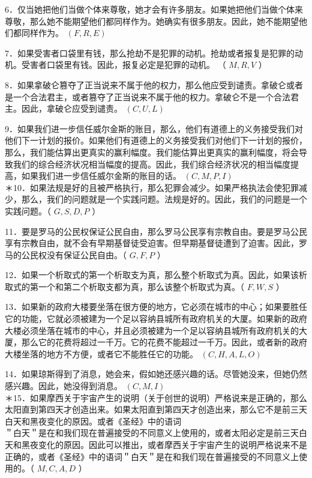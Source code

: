6．仅当她把他们当做个体来尊敬，她才会有许多朋友。如果她把他们当做个体来尊敬，那么她不能期望他们都同样作为。她确实有很多朋友。因此，她不能期望他们都同样作为。 $(F, R, E)$

7．如果受害者口袋里有钱，那么抢劫不是犯罪的动机。抢劫或者报复是犯罪的动机。受害者口袋里有钱。因此，报复必定是犯罪的动机。 （ $M, R, V$ ）

8．如果拿破仑篡夺了正当说来不属于他的权力，那么他应受到谴责。拿破仑或者是一个合法君主，或者篡夺了正当说来不属于他的权力。拿破仑不是一个合法君主。因此，拿破仑应受到谴责。 $(C, U, L)$

9．如果我们进一步信任威尔金斯的账目，那么，他们有道德上的义务接受我们对他们下一计划的报价。如果他们有道德上的义务接受我们对他们下一计划的报价，那么，我们能估算出更真实的赢利幅度。我们能估算出更真实的赢利幅度，将会导致我们的综合经济状况相当幅度的提高。因此，我们综合经济状况的相当幅度提高，如果我们进一步信任威尔金斯的账目的话。 $(C, M, P, I)$\\
＊10．如果法规是好的且被严格执行，那么犯罪会减少。如果严格执法会使犯罪减少，那么，我们的问题就是一个实践问题。法规是好的。因此，我们的问题是一个实践问题。（ $G, S, D, P$ ）

11．要是罗马的公民权保证公民自由，那么罗马公民享有宗教自由。要是罗马公民享有宗教自由，就不会有早期基督徒受迫害。但早期基督徒遭到了迫害。因此，罗马的公民权没有保证公民自由。（ $G, F, P$ ）

12．如果一个析取式的第一个析取支为真，那么整个析取式为真。因此，如果该析取式的第一个和第二个析取支都为真，那么该整个析取式为真。（ $F, W, S$ ）

13．如果新的政府大楼要坐落在很方便的地方，它必须在城市的中心；如果要胜任它的功能，它就必须被建为一个足以容纳县城所有政府机关的大厦。如果新的政府大楼必须坐落在城市的中心，并且必须被建为一个足以容纳县城所有政府机关的大厦，那么它的花费将超过一千万。它的花费不能超过一千万。因此，或者新的政府大楼坐落的地方不方便，或者它不能胜任它的功能。 $(C, H, A, L, O)$

14．如果琼斯得到了消息，她会来，假如她还感兴趣的话。尽管她没来，但她仍然感兴趣。因此，她没得到消息。 $(C, M, I)$\\
＊15．如果摩西关于宇宙产生的说明（关于创世的说明）严格说来是正确的，那么太阳直到第四天才创造出来。如果太阳直到第四天才创造出来，那么它不是前三天白天和黑夜变化的原因。或者《圣经》中的语词\\
＂白天＂是在和我们现在普遍接受的不同意义上使用的，或者太阳必定是前三天白天和黑夜变化的原因。因此可以推出，或者摩西关于宇宙产生的说明严格说来不是正确的，或者《圣经》中的语词＂白天＂是在和我们现在普遍接受的不同意义上使用的。（ $M, C, A, D$ ）

